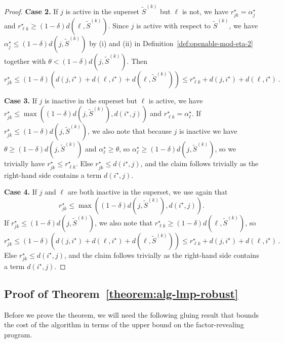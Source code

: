 \begin{proof}
    \textbf{Case 2.} If $j$ is active in the superset $\tilde{S}^{(k)}$ but $\ell$ is not, we have $r^\star_{jk} = \alpha_j^\star$ and $r^\star_{\ell k} \geq (1-\delta)d(\ell, \tilde{S}^{(k)})$.
    Since $j$ is active with respect to $\tilde{S}^{(k)}$, we have $\alpha_j^\star \leq (1-\delta)d(j, \tilde{S}^{(k)})$ by (i) and (ii) in Definition~\ref{def:openable-mod-eta-2} together with $\theta < (1-\delta)d(j, \tilde{S}^{(k)})$.
    Then 
    \[r^\star_{jk} \leq (1-\delta)(d(j, i^\star) + d(\ell, i^\star) + d(\ell, \tilde S^{(k)})) \leq r^\star_{\ell k} + d(j, i^\star) + d(\ell, i^\star)\,.\]
    
    \textbf{Case 3.} If $j$ is inactive in the superset but $\ell$ is active, we have $r_{jk}^\star \leq \max((1-\delta)d(j, \tilde S^{(k)}), d(i^\star, j))$ and $r^\star_{\ell k} = \alpha^\star_\ell$.
    If $r^\star_{jk} \leq (1-\delta) d(j, \tilde S^{(k)})$, we also note that because $j$ is inactive we have $\theta \geq (1-\delta) d(j, \tilde S^{(k)})$ and $\alpha^\star_\ell \geq \theta$, so $\alpha^\star_\ell \geq (1-\delta) d(j, \tilde S^{(k)})$, so we trivially have $r^\star_{jk} \leq r^\star_{\ell k}$.
    Else $r^\star_{jk} \leq d(i^\star, j)$, and the claim follows trivially as the right-hand side contains a term $d(i^\star, j)$.

    \textbf{Case 4.} If $j$ and $\ell$ are both inactive in the superset, we use again that 
    \[r_{jk}^\star \leq \max((1-\delta)d(j, \tilde S^{(k)}), d(i^\star, j)).\]
    If $r^\star_{jk} \leq (1-\delta) d(j, \tilde S^{(k)})$, we also note that $r^\star_{\ell k } \geq (1-\delta) d(\ell, \tilde S^{(k)})$, so
    \[r^\star_{jk} \leq (1-\delta)(d(j, i^\star) + d(\ell, i^\star) + d(\ell, \tilde S^{(k)})) \leq r^\star_{\ell k} + d(j, i^\star) + d(\ell, i^\star)\,.\]
    Else $r^\star_{jk} \leq d(i^\star, j)$, and the claim follows trivially as the right-hand side contains a term $d(i^\star, j)$.

\end{proof}

\subsection{Proof of Theorem~\ref{theorem:alg-lmp-robust}}
\label{subsec:lmp-proof-robust}
Before we prove the theorem, we will need the following gluing result that bounds the cost of the algorithm in terms of the upper bound on the factor-revealing program.

